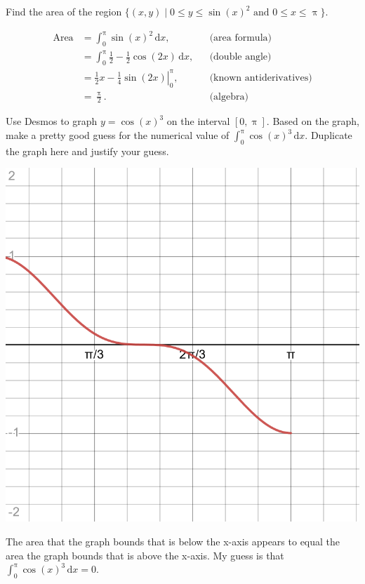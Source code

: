 \documentclass[12pt,fleqn,answers]{exam}
\begin{document}
\begin{questions} 

\question [1] Find the area of the region $\{(x,y) \mid 0 \leq y \leq \sin(x)^2 \mbox{ and } 0 \leq x \leq \uppi \}$.

\begin{solution}[2.5in]
    \begin{align*} \text{Area} &= \int_0^\uppi \sin(x)^2 \, \mathrm{d} x, && \text{(area formula)} \\
                               &= \int_0^\uppi \frac{1}{2} - \frac{1}{2} \cos(2 x) \, \mathrm{d} x, && \text{(double angle)} \\
                               &= \left. \frac{1}{2} x  - \frac{1}{4} \sin(2 x) \right |_{0}^\uppi, && \text{(known antiderivatives)}\\
                               &= \frac{\uppi}{2}. && \text{(algebra)}
    \end{align*}
\end{solution}


\question [1] Use Desmos to graph $y = \cos(x)^3$ on the interval $[0,\uppi]$. Based 
on the graph, make a pretty good guess for the numerical value of 
$\int_0^\uppi \cos(x)^3 \, \mathrm{d} x$. Duplicate the graph here 
and justify your guess.

\begin{solution}%

    \begin{center}
     \includegraphics[scale=0.2]{desmos-graph(19).png}
    \end{center}
The area that the graph bounds that is below the x-axis appears to 
equal the area the graph bounds that is above the x-axis. My guess 
is that $\int_0^\uppi \cos(x)^3 \, \mathrm{d} x = 0$. 


\end{solution}
\end{questions}
\end{document}
